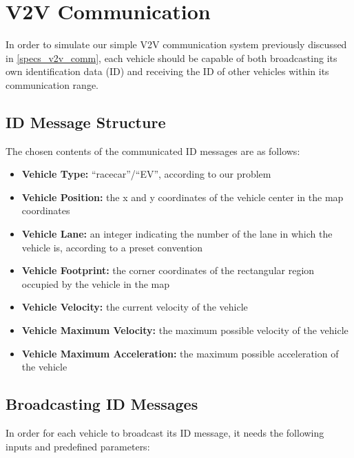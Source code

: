\section{V2V Communication}
\label{method_v2v_comm}
In order to simulate our simple V2V communication system previously discussed in \ref{specs_v2v_comm}, each vehicle should be capable of both broadcasting its own identification data (ID) and receiving the ID of other vehicles within its communication range. 

\subsection{ID Message Structure}
\label{method_ID_struct}
The chosen contents of the communicated ID messages are as follows:

\begin{itemize}
    \item \textbf{Vehicle Type:} “racecar”/“EV”, according to our problem
    \item \textbf{Vehicle Position:} the x and y coordinates of the vehicle center in the map coordinates
    \item \textbf{Vehicle Lane:} an integer indicating the number of the lane in which the vehicle is, according to a preset convention
    \item \textbf{Vehicle Footprint:} the corner coordinates of the rectangular region occupied by the vehicle in the map
    \item \textbf{Vehicle Velocity:} the current velocity of the vehicle
    \item \textbf{Vehicle Maximum Velocity:} the maximum possible velocity of the vehicle
    \item \textbf{Vehicle Maximum Acceleration:} the maximum possible acceleration of the vehicle
\end{itemize}

\subsection{Broadcasting ID Messages}
\label{method_comm_send}
In order for each vehicle to broadcast its ID message, it needs the following inputs and predefined parameters:

